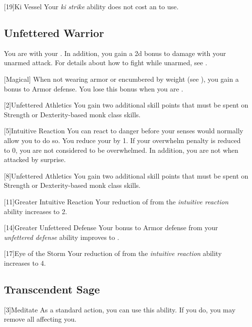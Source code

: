         [19]{Ki Vessel} Your \textit{ki strike} ability does not cost an  to use.

    \subsection{Unfettered Warrior}
        You are  with your .
        In addition, you gain a \plus2d bonus to damage with your unarmed attack.
        For details about how to fight while unarmed, see .

        [Magical]
        When not wearing armor or encumbered by weight (see ), you gain a  bonus to Armor defense.
        You lose this bonus when you are \helpless.

        [2]{Unfettered Athletics} You gain two additional skill points that must be spent on Strength or Dexterity-based monk class skills.

        [5]{Intuitive Reaction} You can react to danger before your senses would normally allow you to do so.
        You reduce your  by 1.
        If your overwhelm penalty is reduced to 0, you are not considered to be overwhelmed.
        In addition, you are not \unaware when attacked by surprise.

        [8]{Unfettered Athletics} You gain two additional skill points that must be spent on Strength or Dexterity-based monk class skills.

        [11]{Greater Intuitive Reaction}
        Your reduction of  from the \textit{intuitive reaction} ability increases to 2.

        [14]{Greater Unfettered Defense}
        Your bonus to Armor defense from your \textit{unfettered defense} ability improves to .

        [17]{Eye of the Storm}
        Your reduction of  from the \textit{intuitive reaction} ability increases to 4.

    \subsection{Transcendent Sage}

        [3]{Meditate} As a standard action, you can use this ability.
        If you do, you may remove all  affecting you.

